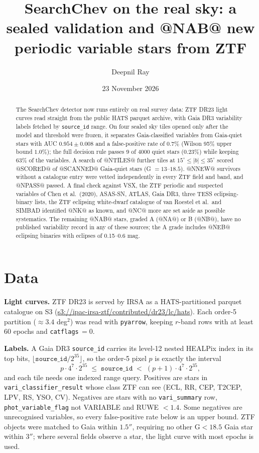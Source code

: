 \documentclass[11pt]{article}
\title{SearchChev on the real sky: a sealed validation and @NAB@ new\\ periodic variable stars from ZTF}
\author{Deepnil Ray}
\date{23 November 2026}
\begin{document}
\maketitle
\begin{abstract}
The SearchChev detector now runs entirely on real survey data: ZTF DR23 light curves read straight from the public HATS parquet archive, with Gaia DR3 variability labels fetched by \texttt{source\_id} range. On four sealed sky tiles opened only after the model and threshold were frozen, it separates Gaia-classified variables from Gaia-quiet stars with AUC $0.954\pm0.008$ and a false-positive rate of $0.7\%$ (Wilson 95\% upper bound $1.0\%$); the full decision rule passes $9$ of $4000$ quiet stars ($0.23\%$) while keeping $63\%$ of the variables. A search of @NTILES@ further tiles at $15^\circ\le|b|\le35^\circ$ scored @SCORED@ of @SCANNED@ Gaia-quiet stars (G $=13$--$18.5$). @NNEW@ survivors without a catalogue entry were vetted independently in every ZTF field and band, and @NPASS@ passed. A final check against VSX, the ZTF periodic and suspected variables of Chen et al.\ (2020), ASAS-SN, ATLAS, Gaia DR3, three TESS eclipsing-binary lists, the ZTF eclipsing white-dwarf catalogue of van Roestel et al.\ and SIMBAD identified @NK@ as known, and @NC@ more are set aside as possible systematics. The remaining @NAB@ stars, graded A (@NA@) or B (@NB@), have no published variability record in any of these sources; the A grade includes @NEB@ eclipsing binaries with eclipses of 0.15--0.6 mag.
\end{abstract}

\section{Data}
\textbf{Light curves.} ZTF DR23 is served by IRSA as a HATS-partitioned parquet catalogue on S3 (\url{s3://ipac-irsa-ztf/contributed/dr23/lc/hats}). Each order-5 partition ($\approx3.4$ deg$^2$) was read with \texttt{pyarrow}, keeping $r$-band rows with at least 60 epochs and \texttt{catflags}$\,=0$.

\textbf{Labels.} A Gaia DR3 \texttt{source\_id} carries its level-12 nested HEALPix index in its top bits, $\lfloor \texttt{source\_id}/2^{35}\rfloor$, so the order-5 pixel $p$ is exactly the interval
\[
p\cdot4^{7}\cdot2^{35}\;\le\;\texttt{source\_id}\;<\;(p+1)\cdot4^{7}\cdot2^{35},
\]
and each tile needs one indexed range query. Positives are stars in \texttt{vari\_classifier\_result} whose class ZTF can see (ECL, RR, CEP, T2CEP, LPV, RS, YSO, CV). Negatives are stars with no \texttt{vari\_summary} row, \texttt{phot\_variable\_flag} not VARIABLE and RUWE $<1.4$. Some negatives are unrecognised variables, so every false-positive rate below is an upper bound. ZTF objects were matched to Gaia within $1.5''$, requiring no other G$<18.5$ Gaia star within $3''$; where several fields observe a star, the light curve with most epochs is used.
\end{document}
